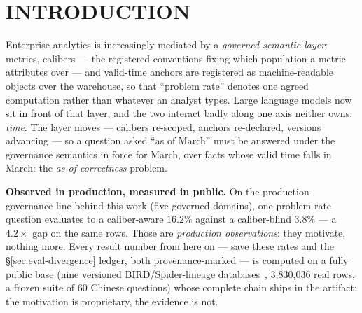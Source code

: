 \providecommand{\sysname}{\textsc{AsOfGov}}
\providecommand{\sem}[1]{[\![#1]\!]}
\providecommand{\ver}{\mathrm{ver}}
\providecommand{\OOV}{\mathsf{OOV}}
\providecommand{\AM}{\mathsf{AM}}
\providecommand{\MC}{\mathsf{MC}}
\providecommand{\ANSW}{\mathsf{ANSWER}}
\providecommand{\REWR}{\mathsf{REWRITE}}
\providecommand{\REFU}{\mathsf{REFUSE}}

\section{INTRODUCTION}
\label{sec:intro}

 Enterprise analytics is increasingly mediated by a \emph{governed semantic
layer}: metrics, calibers --- the registered conventions fixing which
population a metric attributes over --- and valid-time anchors are
registered as machine-readable objects over the warehouse, so that ``problem
rate'' denotes one agreed computation rather than whatever an analyst
types. Large language models now sit in front of that layer, and the two
interact badly along one axis neither owns: \emph{time}. The layer
moves --- calibers re-scoped, anchors re-declared, versions advancing ---
so a question asked ``as of March'' must be answered under the governance
semantics in force for March, over facts whose valid time falls in March: the
\emph{as-of correctness} problem.

\smallskip\noindent{}\textbf{Observed in production, measured in public.}
On the production governance
line behind this work (five governed domains), one problem-rate question
evaluates to a
caliber-aware $16.2\%$ against a caliber-blind $3.8\%$ --- a $4.2\times$ gap
on the same rows. Those are \emph{production observations}: they motivate,
nothing more. Every result number from here
on --- save these rates
and the \S\ref{sec:eval-divergence} ledger, both provenance-marked ---
is computed on a fully public base (nine versioned
BIRD/Spider-lineage databases~\cite{bird,spider}, 3{,}830{,}036 real rows, a
frozen
suite of 60 Chinese questions) whose complete chain ships in the artifact: the
motivation is proprietary, the evidence is not.

